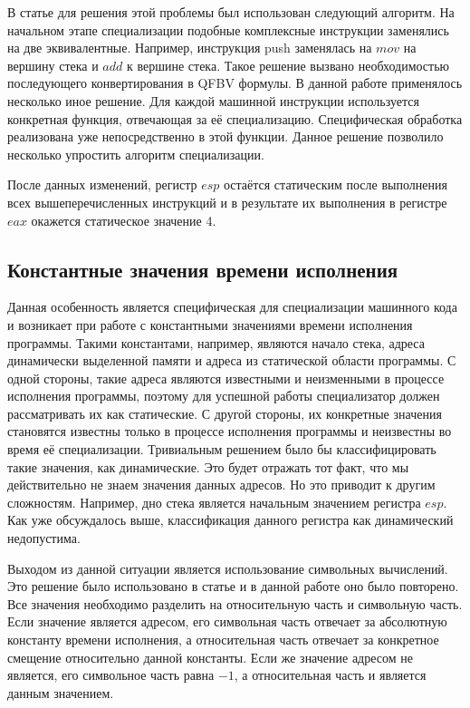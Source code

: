 \documentclass{spbau-diploma}
\begin{document}
В статье \cite{PEMC} для решения этой проблемы был использован следующий алгоритм. На начальном этапе специализации подобные комплексные инструкции заменялись на две эквивалентные. Например, инструкция push заменялась на $mov$ на вершину стека и $add$ к вершине стека. Такое решение вызвано необходимостью последующего конвертирования в QFBV формулы. В данной работе применялось несколько иное решение. Для каждой машинной инструкции используется конкретная функция, отвечающая за её специализацию. Специфическая обработка реализована уже непосредственно в этой функции. Данное решение позволило несколько упростить алгоритм специализации.

После данных изменений, регистр $esp$ остаётся статическим после выполнения всех вышеперечисленных инструкций и в результате их выполнения в регистре $eax$ окажется статическое значение 4.

\subsection{ Константные значения времени исполнения}
\label{part:4.3}
Данная особенность является специфическая для специализации машинного кода и возникает при работе с константными значениями времени исполнения программы. Такими константами, например, являются начало стека, адреса динамически выделенной памяти и адреса из статической области программы. С одной стороны, такие адреса являются известными и неизменными в процессе исполнения программы, поэтому для успешной работы специализатор должен рассматривать их как статические. С другой стороны, их конкретные значения становятся известны только в процессе исполнения программы и неизвестны во время её специализации.  Тривиальным решением было бы классифицировать такие значения, как динамические. Это будет отражать тот факт, что мы действительно не знаем значения данных адресов. Но это приводит к другим сложностям. Например, дно стека является начальным значением регистра $esp$. Как уже обсуждалось выше, классификация данного регистра как динамический недопустима. 

Выходом из данной ситуации является использование символьных вычислений. Это решение было использовано в статье \cite{PEMC} и в данной работе оно было повторено. Все значения необходимо разделить на относительную часть и символьную часть. Если значение является адресом, его символьная часть отвечает за абсолютную константу времени исполнения, а относительная часть отвечает за конкретное смещение относительно данной константы. Если же значение адресом не является, его символьное часть равна $-1$, а относительная часть и является данным значением. 
\end{document}

